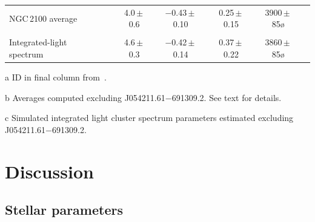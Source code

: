 \begin{table}
\begin{center}
\begin{threeparttable}
\begin{tabular}{lc ccccl}
\\
NGC\,2100 average\tnote{b} & & 4.0\,$\pm$\,0.6 & $-$0.43\,$\pm$\,0.10 & 0.25\,$\pm$\,0.15 & 3900\,$\pm$\,85\o\\
\\
Integrated-light spectrum\tnote{c}             & & 4.6\,$\pm$\,0.3 & $-$0.42\,$\pm$\,0.14 & 0.37\,$\pm$\,0.22 & 3860\,$\pm$\,85\o\\
  \hline
  \end{tabular}
\begin{tablenotes}
    \item [a] ID in final column from{~\cite{1974A&AS...15..261R}}.
    \item [b] Averages computed excluding J054211.61$-$691309.2. See text for details.
    \item [c] Simulated integrated light cluster spectrum parameters estimated excluding J054211.61$-$691309.2.
\end{tablenotes}
  \end{threeparttable}
  \end{center}
\end{table}


\section{Discussion} %
\label{sec:ngc2100disc}

\subsection{Stellar parameters} %
\label{sub:stellar_parameters_disc}

